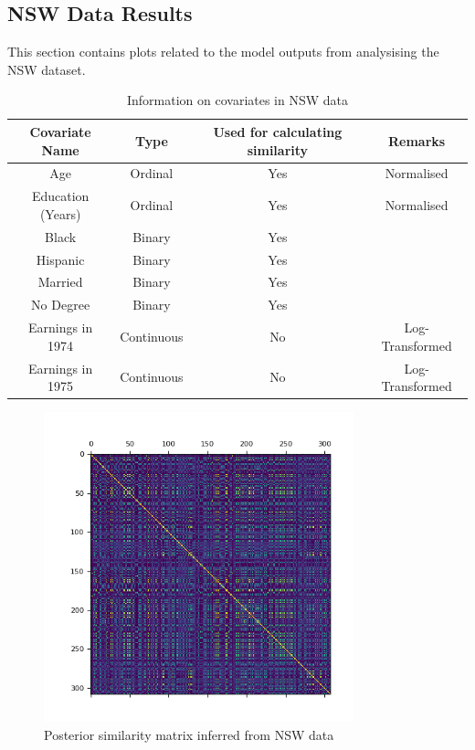 \documentclass{article}
\begin{document}
\begin{appendices}
\section{NSW Data Results}
This section contains plots related to the model outputs from analysising the NSW dataset.

\begin{table}[h]
\centering
\begin{tabular}{cccc}
\hline
Covariate Name & Type & Used for calculating similarity & Remarks \\
\hline
Age & Ordinal & Yes & Normalised\\
Education (Years) & Ordinal & Yes & Normalised\\
Black & Binary & Yes &  \\
Hispanic & Binary & Yes &  \\
Married & Binary & Yes &  \\
No Degree & Binary & Yes &  \\
Earnings in 1974 & Continuous & No & Log-Transformed\\ 
Earnings in 1975 & Continuous & No & Log-Transformed\\ 
\hline
\end{tabular}
\caption{Information on covariates in NSW data}
\label{tab:nsw_covariate_info}
\end{table}


\begin{figure}[h]
  \centering
  \includegraphics[width=0.8\textwidth]{Plots/NSW Posterior Similarity Matrix.png}
  \caption{Posterior similarity matrix inferred from NSW data}
  \label{fig:nsw_post_mat}
\end{figure}


\end{appendices}
\end{document}
